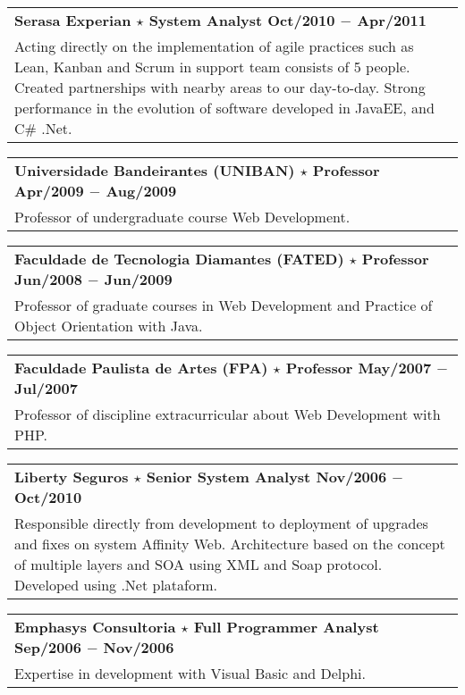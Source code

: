 \documentclass[a4paper, oneside, final]{scrartcl}
\newcommand{\vspc}{\vspace{0.15cm}} %
\begin{document}
\begin{center}
\begin{tabularx}{1\linewidth}{X}
{\bf Serasa Experian $\star$  System Analyst \hfill Oct/2010 $-$ Apr/2011} \\
Acting directly on the implementation of agile practices such as Lean, Kanban and Scrum in support team consists of 5 people. Created partnerships with nearby areas to our day-to-day. Strong performance in the evolution of software developed in JavaEE, and C\# .Net. \vspc\\
\end{tabularx}

\begin{tabularx}{1\linewidth}{X}
{\bf Universidade Bandeirantes (UNIBAN) $\star$ Professor \hfill Apr/2009 $-$ Aug/2009} \\
Professor of undergraduate course Web Development. \vspc\\
\end{tabularx}

\begin{tabularx}{1\linewidth}{X}
{\bf Faculdade de Tecnologia Diamantes (FATED) $\star$ Professor \hfill Jun/2008 $-$ Jun/2009} \\
Professor of graduate courses in Web Development and Practice of Object Orientation with Java. \vspc\\
\end{tabularx}

\begin{tabularx}{1\linewidth}{X}
{\bf Faculdade Paulista de Artes (FPA) $\star$ Professor  \hfill May/2007 $-$ Jul/2007} \\
Professor of discipline extracurricular about Web Development with PHP. \vspc\\
\end{tabularx}

\begin{tabularx}{1\linewidth}{X}
{\bf Liberty Seguros $\star$ Senior System Analyst \hfill Nov/2006 $-$ Oct/2010} \\
Responsible directly from development to deployment of upgrades and fixes on system Affinity Web. Architecture based on the concept of multiple layers and SOA using XML and Soap protocol. Developed using .Net plataform.\vspc\\
\end{tabularx}

\begin{tabularx}{1\linewidth}{X}
{\bf Emphasys Consultoria $\star$ Full Programmer Analyst \hfill Sep/2006 $-$ Nov/2006} \\
Expertise in development with Visual Basic and Delphi. \vspc\\
\end{tabularx}


\end{center}
\end{document}
